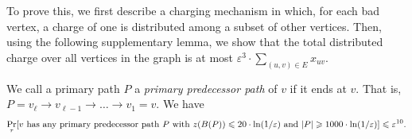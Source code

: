 To prove this, we first describe a charging mechanism in which, for each bad vertex, a charge of one is distributed 
among a subset of other vertices. 
Then, using the following supplementary lemma, we show that the total distributed charge over all vertices in the graph is at most $\varepsilon^{3} \cdot \sum_{(u,v) \in E} x_{uv}$.

\begin{lem}
  \label{lem:thin-long-path}
  We call a primary path $P$ a \emph{primary predecessor path} of $v$ if it ends at $v$. That is, $P = v_\ell \to v_{\ell-1} \to \dots \to v_{1} = v$. 
  We have
  \begin{align*}
	\Pr_\tau [\mbox{$v$ has any primary predecessor path $P$ with $z(B(P)) \leqslant 20 \cdot \ln(1/\varepsilon)$ and $|P| \geqslant 1000 \cdot \ln(1/\varepsilon)$}] \leqslant \varepsilon^{10}.
  \end{align*}
\end{lem}
